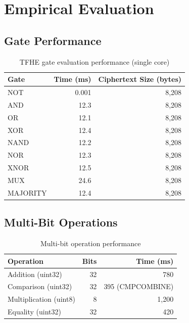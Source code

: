 \section{Empirical Evaluation}

\label{sec:evaluation}

\subsection{Gate Performance}

\begin{table}[h]
\centering
\begin{tabular}{@{}lrr@{}}
\toprule
\textbf{Gate} & \textbf{Time (ms)} & \textbf{Ciphertext Size (bytes)} \\
\midrule
NOT & 0.001 & 8,208 \\
AND & 12.3 & 8,208 \\
OR & 12.1 & 8,208 \\
XOR & 12.4 & 8,208 \\
NAND & 12.2 & 8,208 \\
NOR & 12.3 & 8,208 \\
XNOR & 12.5 & 8,208 \\
MUX & 24.6 & 8,208 \\
MAJORITY & 12.4 & 8,208 \\
\bottomrule
\end{tabular}
\caption{TFHE gate evaluation performance (single core)}
\label{tab:gate-perf}
\end{table}

\subsection{Multi-Bit Operations}

\begin{table}[h]
\centering
\begin{tabular}{@{}lrr@{}}
\toprule
\textbf{Operation} & \textbf{Bits} & \textbf{Time (ms)} \\
\midrule
Addition (uint32) & 32 & 780 \\
Comparison (uint32) & 32 & 395 (CMPCOMBINE) \\
Multiplication (uint8) & 8 & 1,200 \\
Equality (uint32) & 32 & 420 \\
\bottomrule
\end{tabular}
\caption{Multi-bit operation performance}
\label{tab:multibit}
\end{table}

